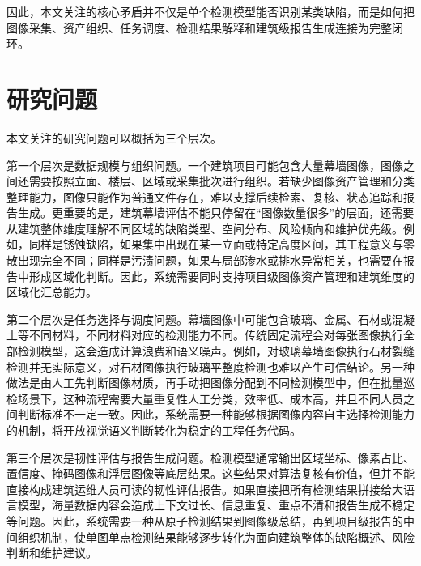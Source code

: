 因此，本文关注的核心矛盾并不仅是单个检测模型能否识别某类缺陷，而是如何把图像采集、资产组织、任务调度、检测结果解释和建筑级报告生成连接为完整闭环。

\section{研究问题}
\label{sec:introduction-research-problem}

本文关注的研究问题可以概括为三个层次。

第一个层次是数据规模与组织问题。一个建筑项目可能包含大量幕墙图像，图像之间还需要按照立面、楼层、区域或采集批次进行组织。若缺少图像资产管理和分类整理能力，图像只能作为普通文件存在，难以支撑后续检索、复核、状态追踪和报告生成。更重要的是，建筑幕墙评估不能只停留在“图像数量很多”的层面，还需要从建筑整体维度理解不同区域的缺陷类型、空间分布、风险倾向和维护优先级。例如，同样是锈蚀缺陷，如果集中出现在某一立面或特定高度区间，其工程意义与零散出现完全不同；同样是污渍问题，如果与局部渗水或排水异常相关，也需要在报告中形成区域化判断。因此，系统需要同时支持项目级图像资产管理和建筑维度的区域化汇总能力。

第二个层次是任务选择与调度问题。幕墙图像中可能包含玻璃、金属、石材或混凝土等不同材料，不同材料对应的检测能力不同。传统固定流程会对每张图像执行全部检测模型，这会造成计算浪费和语义噪声。例如，对玻璃幕墙图像执行石材裂缝检测并无实际意义，对石材图像执行玻璃平整度检测也难以产生可信结论。另一种做法是由人工先判断图像材质，再手动把图像分配到不同检测模型中，但在批量巡检场景下，这种流程需要大量重复性人工分类，效率低、成本高，并且不同人员之间判断标准不一定一致。因此，系统需要一种能够根据图像内容自主选择检测能力的机制，将开放视觉语义判断转化为稳定的工程任务代码。

第三个层次是韧性评估与报告生成问题。检测模型通常输出区域坐标、像素占比、置信度、掩码图像和浮层图像等底层结果。这些结果对算法复核有价值，但并不能直接构成建筑运维人员可读的韧性评估报告。如果直接把所有检测结果拼接给大语言模型，海量数据内容会造成上下文过长、信息重复、重点不清和报告生成不稳定等问题。因此，系统需要一种从原子检测结果到图像级总结，再到项目级报告的中间组织机制，使单图单点检测结果能够逐步转化为面向建筑整体的缺陷概述、风险判断和维护建议。

